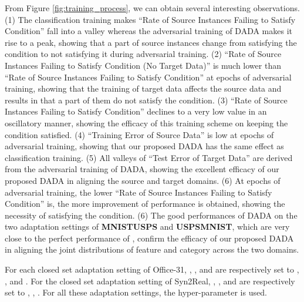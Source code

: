 \documentclass[letterpaper]{article} \usepackage{aaai20}  \usepackage{times}  \usepackage{helvet} \usepackage{courier}  \usepackage[hyphens]{url}  \usepackage{graphicx} \urlstyle{rm} \def\UrlFont{\rm}  \usepackage{graphicx}  \frenchspacing  \setlength{\pdfpagewidth}{8.5in}  \setlength{\pdfpageheight}{11in}
\begin{document}
From Figure \ref{fig:training_process}, we can obtain several interesting observations. (1) The classification training makes ``Rate of Source Instances Failing to Satisfy Condition'' fall into a valley whereas the adversarial training of DADA makes it rise to a peak, showing that a part of source instances change from satisfying the condition to not satisfying it during adversarial training. (2)  ``Rate of Source Instances Failing to Satisfy Condition (No Target Data)'' is much lower than ``Rate of Source Instances Failing to Satisfy Condition'' at epochs of adversarial training, showing that the training of target data affects the source data and results in that a part of them do not satisfy the condition. (3) ``Rate of Source Instances Failing to Satisfy Condition'' declines to a very low value in an oscillatory manner, showing the efficacy of this training scheme on keeping the condition satisfied. (4) ``Training Error of Source Data'' is low at epochs of adversarial training, showing that our proposed DADA has the same effect as classification training. (5) All valleys of ``Test Error of Target Data'' are derived from the adversarial training of DADA, showing the excellent efficacy of our proposed DADA in aligning the source and target domains. (6) At epochs of adversarial training, the lower ``Rate of Source Instances Failing to Satisfy Condition'' is, the more improvement of performance is obtained, showing the necessity of satisfying the condition. (6) The good performances of DADA on the two adaptation settings of \textbf{MNIST}\textbf{USPS} and \textbf{USPS}\textbf{MNIST}, which are very close to the perfect performance of , confirm the efficacy of our proposed DADA in aligning the joint distributions of feature and category across the two domains.

For each closed set adaptation setting of Office-31, , , and  are respectively set to , , and . For the closed set adaptation setting of Syn2Real, , , and  are respectively set to , , . For all these adaptation settings, the hyper-parameter  is used. 
\end{document}
